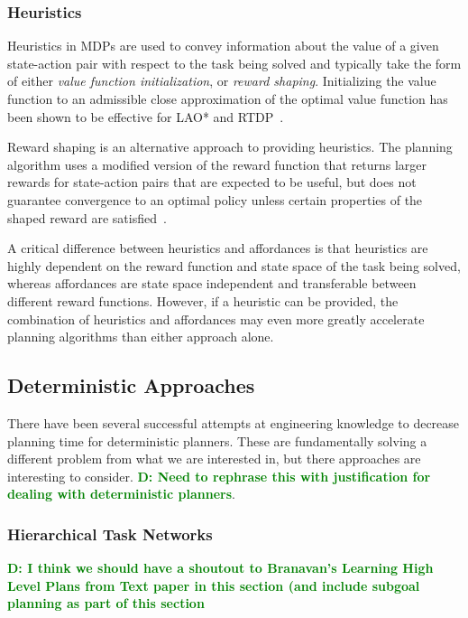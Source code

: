 \documentclass[conference]{IEEEtran}
\newcommand{\dnote}[1]{\textcolor{Green}{\textbf{D: #1}}}
\begin{document}
\subsubsection{Heuristics}
Heuristics in MDPs are used to convey information about the value of a given state-action pair with respect to the task being solved and typically take the form of either {\em value function initialization},
or {\em reward shaping}. Initializing the value function to an admissible close approximation of the optimal value function has been shown to be effective for LAO* and RTDP~\cite{Hansen:1999qf}.

Reward shaping is an alternative approach to providing heuristics. The planning algorithm uses a modified version of the reward function that returns larger rewards for state-action pairs that are expected to be useful, but does not guarantee convergence to an optimal policy unless certain properties of the shaped reward are satisfied~\cite{potshap}.

A critical difference between heuristics and affordances is that heuristics are highly dependent on the reward function and state space of the task being solved, whereas affordances are state space independent and transferable between different reward functions. However, if a heuristic can be provided, the combination of heuristics and affordances may even more greatly accelerate planning algorithms than either approach alone.

\subsection{Deterministic Approaches}

There have been several successful attempts at engineering knowledge to
decrease planning time for deterministic planners. These are fundamentally solving
a different problem from what we are interested in, but there approaches are interesting to consider.
\dnote{Need to rephrase this with justification for dealing with deterministic planners}.

\subsubsection{Hierarchical Task Networks}

\dnote{I think we should have a shoutout to Branavan's Learning High Level Plans from Text paper in this section (and include subgoal planning as part of this section}
\end{document}
